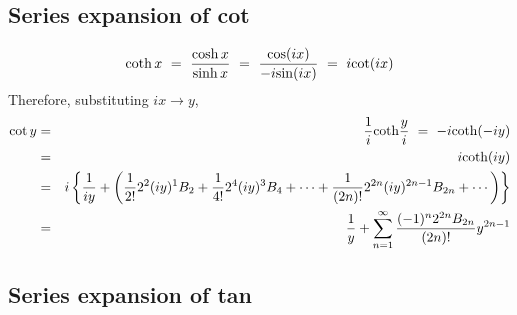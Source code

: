 \documentclass[uplatex,a4j,12pt,dvipdfmx]{jsarticle}
\begin{document}
\subsection{Series expansion of cot}
\begin{eqnarray}
	{\rm coth} \ \! x
	\ = \
	\dfrac{{\rm cosh} \ \! x}{{\rm sinh} \ \! x}
	\ = \
	\dfrac{{\rm cos}(ix)}{-i{\rm sin}(ix)}
	\ = \
	i {\rm cot} (ix)
\end{eqnarray}
Therefore, substituting $ix \to y$,
\begin{eqnarray}
	{\rm cot} \ \! y
	&=&
	\dfrac{1}{i} {\rm coth} \dfrac{y}{i}
	\ = \
	-i {\rm coth} (-iy)
	\nonumber \\ &=&
	i {\rm coth} (iy)
	\nonumber \\ &=&
	i
	\left\{
	\dfrac{1}{iy}
	+
	\left(
	\dfrac{1}{2!}
	2^{2} (iy)^{1}
	B_{2}
	+
	\dfrac{1}{4!}
	2^{4} (iy)^{3}
	B_{4}
	+
	\cdots
	+
	\dfrac{1}{(2n)!}
	2^{2n} (iy)^{2n-1}
	B_{2n}
	+
	\cdots
	\right)
	\right\}
	\nonumber \\ &=&
	\dfrac{1}{y}
	+
	\sum_{n=1}^{\infty}
	\dfrac{(-1)^{n} 2^{2n} B_{2n} }{(2n)!}
	y^{2n-1}
\end{eqnarray}

\subsection{Series expansion of tan}
\end{document}
